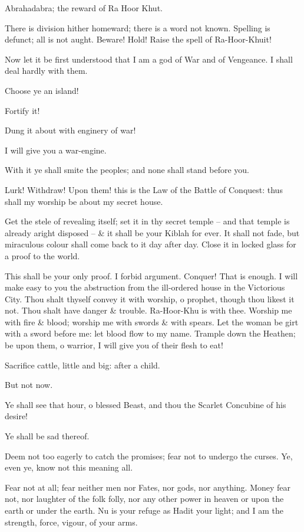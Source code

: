 Abrahadabra; the reward of Ra Hoor Khut.

There is division hither homeward; there is a word not known. Spelling is defunct; all is not aught. Beware! Hold! Raise the spell of Ra-Hoor-Khuit!

Now let it be first understood that I am a god of War and of Vengeance. I shall deal hardly with them.

Choose ye an island!

Fortify it!

Dung it about with enginery of war!

I will give you a war-engine.

With it ye shall smite the peoples; and none shall stand before you.

Lurk! Withdraw! Upon them! this is the Law of the Battle of Conquest: thus shall my worship be about my secret house.

Get the stele of revealing itself; set it in thy secret temple -- and that temple is already aright disposed -- \& it shall be your Kiblah for ever. It shall not fade, but miraculous colour shall come back to it day after day. Close it in locked glass for a proof to the world.

This shall be your only proof. I forbid argument. Conquer! That is enough. I will make easy to you the abstruction from the ill-ordered house in the Victorious City. Thou shalt thyself convey it with worship, o prophet, though thou likest it not. Thou shalt have danger \& trouble. Ra-Hoor-Khu is with thee. Worship me with fire \& blood; worship me with swords \& with spears. Let the woman be girt with a sword before me: let blood flow to my name. Trample down the Heathen; be upon them, o warrior, I will give you of their flesh to eat!

Sacrifice cattle, little and big: after a child.

But not now.

Ye shall see that hour, o blessed Beast, and thou the Scarlet Concubine of his desire!

Ye shall be sad thereof.

Deem not too eagerly to catch the promises; fear not to undergo the curses. Ye, even ye, know not this meaning all.

Fear not at all; fear neither men nor Fates, nor gods, nor anything. Money fear not, nor laughter of the folk folly, nor any other power in heaven or upon the earth or under the earth. Nu is your refuge as Hadit your light; and I am the strength, force, vigour, of your arms.

